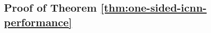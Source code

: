 \documentclass[10pt]{article} %
\theoremstyle{plain}
\theoremstyle{definition}
\theoremstyle{remark}
\begin{document}


\subsection{Proof of Theorem \ref{thm:one-sided-icnn-performance}} \label{app:thm-one-sided}
\end{document}
